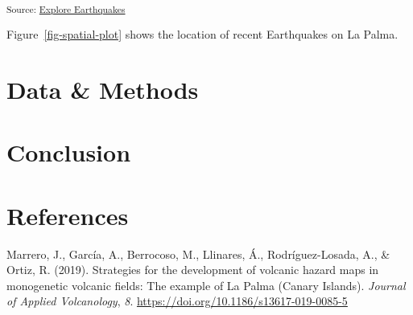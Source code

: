 \documentclass[
]{agujournal2019}
\newlength{\cslhangindent}
\newenvironment{CSLReferences}[2] %
 {\begin{list}{}{%
  \setlength{\itemindent}{0pt}
  \setlength{\leftmargin}{0pt}
  \setlength{\parsep}{0pt}
  \ifodd #1
   \setlength{\leftmargin}{\cslhangindent}
   \setlength{\itemindent}{-1\cslhangindent}
  \fi
  \setlength{\itemsep}{#2\baselineskip}}}
 {\end{list}}
\begin{document}
\textsubscript{Source:
\href{https://soobaki.github.io/manuscript-tutorial/notebooks/explore-earthquakes-preview.html\#cell-fig-spatial-plot}{Explore
Earthquakes}}

Figure~\ref{fig-spatial-plot} shows the location of recent Earthquakes
on La Palma.

\section{Data \& Methods}\label{sec-data-methods}

\section{Conclusion}\label{conclusion}

\section*{References}\label{references}

\label{refs}
\begin{CSLReferences}{1}{0}
\vspace{1em}

Marrero, J., García, A., Berrocoso, M., Llinares, Á., Rodríguez-Losada,
A., \& Ortiz, R. (2019). Strategies for the development of volcanic
hazard maps in monogenetic volcanic fields: The example of {La} {Palma}
({Canary} {Islands}). \emph{Journal of Applied Volcanology}, \emph{8}.
\url{https://doi.org/10.1186/s13617-019-0085-5}

\end{CSLReferences}
\end{document}

